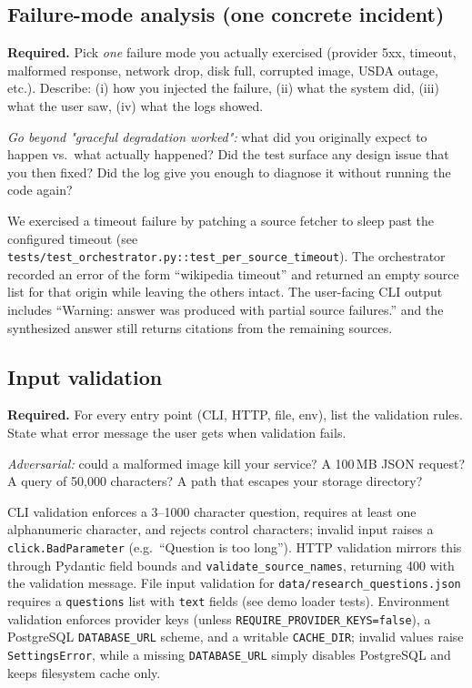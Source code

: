 \documentclass[11pt,a4paper]{article}
\begin{document}
\subsection{Failure-mode analysis (one concrete incident)}

\begin{deliverbox}
\textbf{Required.} Pick \emph{one} failure mode you actually exercised (provider 5xx, timeout, malformed response, network drop, disk full, corrupted image, USDA outage, etc.). Describe: (i) how you injected the failure, (ii) what the system did, (iii) what the user saw, (iv) what the logs showed.
\end{deliverbox}

\begin{probebox}
\textit{Go beyond "graceful degradation worked":} what did you originally expect to happen vs.\ what actually happened? Did the test surface any design issue that you then fixed? Did the log give you enough to diagnose it without running the code again?
\end{probebox}

We exercised a timeout failure by patching a source fetcher to sleep past the configured timeout (see \texttt{tests/test\_orchestrator.py::test\_per\_source\_timeout}). The orchestrator recorded an error of the form ``wikipedia timeout'' and returned an empty source list for that origin while leaving the others intact. The user-facing CLI output includes ``Warning: answer was produced with partial source failures.'' and the synthesized answer still returns citations from the remaining sources.

\subsection{Input validation}

\begin{deliverbox}
\textbf{Required.} For every entry point (CLI, HTTP, file, env), list the validation rules. State what error message the user gets when validation fails.
\end{deliverbox}

\begin{probebox}
\textit{Adversarial:} could a malformed image kill your service? A 100\,MB JSON request? A query of 50,000 characters? A path that escapes your storage directory?
\end{probebox}

CLI validation enforces a 3--1000 character question, requires at least one alphanumeric character, and rejects control characters; invalid input raises a \texttt{click.BadParameter} (e.g.\ ``Question is too long''). HTTP validation mirrors this through Pydantic field bounds and \texttt{validate\_source\_names}, returning 400 with the validation message. File input validation for \texttt{data/research\_questions.json} requires a \texttt{questions} list with \texttt{text} fields (see demo loader tests). Environment validation enforces provider keys (unless \texttt{REQUIRE\_PROVIDER\_KEYS=false}), a PostgreSQL \texttt{DATABASE\_URL} scheme, and a writable \texttt{CACHE\_DIR}; invalid values raise \texttt{SettingsError}, while a missing \texttt{DATABASE\_URL} simply disables PostgreSQL and keeps filesystem cache only.
\end{document}
